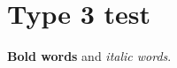 \documentclass{article}
\begin{document}
\section{Type 3 test}
\lipsum[1-3] \textbf{Bold words} and \textit{italic words}.
\end{document}
